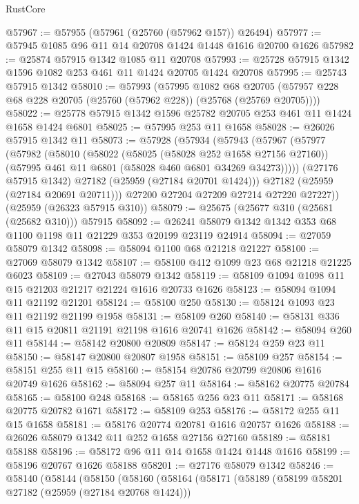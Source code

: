 \begin{lexlean}{RustCore}
\begin{coremodule}
@57967 := @57955 (@57961 (@25760 (@57962 @157)) @26494)
@57977 := @57945 @1085 @96 @11 @14 @20708 @1424 @1448 @1616 @20700 @1626
@57982 := @25874 @57915 @1342 @1085 @11 @20708
@57993 := @25728 @57915 @1342 @1596 @1082 @253 @461 @11 @1424 @20705 @1424 @20708
@57995 := @25743 @57915 @1342
@58010 := @57993
    (@57995
      @1082
      @68
      @20705
      (@57957 @228 @68 @228 @20705 (@25760 (@57962 @228)) (@25768 (@25769 @20705))))
@58022 := @25778 @57915 @1342 @1596 @25782 @20705 @253 @461 @11 @1424 @1658 @1424 @6801
@58025 := @57995 @253 @11 @1658
@58028 := @26026 @57915 @1342 @11
@58073 := @57928
    (@57934
      (@57943
        (@57967
          (@57977
            (@57982
              (@58010
                (@58022
                  (@58025 (@58028 @252 @1658 @27156 @27160))
                  (@57995 @461 @11 @6801 (@58028 @460 @6801 @34269 @34273)))))
            (@27176 @57915 @1342)
            @27182
            (@25959 (@27184 @20701 @1424)))
          @27182
          (@25959 (@27184 @20691 @20711)))
        @27200
        @27204
        @27209
        @27214
        @27220
        @27227))
    (@25959 (@26323 @57915 @310))
@58079 := @25675 (@25677 @310 (@25681 (@25682 @310))) @57915
@58092 := @26241 @58079 @1342 @1342 @353 @68 @1100 @1198 @11 @21229 @353 @20199 @23119 @24914
@58094 := @27059 @58079 @1342
@58098 := @58094 @1100 @68 @21218 @21227
@58100 := @27069 @58079 @1342
@58107 := @58100 @412 @1099 @23 @68 @21218 @21225 @6023
@58109 := @27043 @58079 @1342
@58119 := @58109 @1094 @1098 @11 @15 @21203 @21217 @21224 @1616 @20733 @1626
@58123 := @58094 @1094 @11 @21192 @21201
@58124 := @58100 @250
@58130 := @58124 @1093 @23 @11 @21192 @21199 @1958
@58131 := @58109 @260
@58140 := @58131 @336 @11 @15 @20811 @21191 @21198 @1616 @20741 @1626
@58142 := @58094 @260 @11
@58144 := @58142 @20800 @20809
@58147 := @58124 @259 @23 @11
@58150 := @58147 @20800 @20807 @1958
@58151 := @58109 @257
@58154 := @58151 @255 @11 @15
@58160 := @58154 @20786 @20799 @20806 @1616 @20749 @1626
@58162 := @58094 @257 @11
@58164 := @58162 @20775 @20784
@58165 := @58100 @248
@58168 := @58165 @256 @23 @11
@58171 := @58168 @20775 @20782 @1671
@58172 := @58109 @253
@58176 := @58172 @255 @11 @15 @1658
@58181 := @58176 @20774 @20781 @1616 @20757 @1626
@58188 := @26026 @58079 @1342 @11 @252 @1658 @27156 @27160
@58189 := @58181 @58188
@58196 := @58172 @96 @11 @14 @1658 @1424 @1448 @1616
@58199 := @58196 @20767 @1626 @58188
@58201 := @27176 @58079 @1342
@58246 := @58140
    (@58144
      (@58150
        (@58160
          (@58164
            (@58171
              (@58189
                (@58199 @58201 @27182 (@25959 (@27184 @20768 @1424)))

\end{coremodule}
\end{lexlean}
